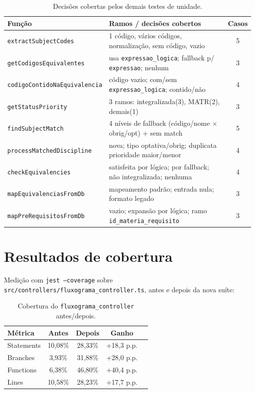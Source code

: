 \documentclass[11pt,a4paper]{article}
\begin{document}
\begin{table}[h]
\centering
\small
\renewcommand{\arraystretch}{1.15}
\begin{tabular}{@{}lp{8.6cm}c@{}}
\toprule
\textbf{Função} & \textbf{Ramos / decisões cobertos} & \textbf{Casos} \\
\midrule
\texttt{extractSubjectCodes}        & 1 código, vários códigos, normalização, sem código, vazio & 5 \\
\texttt{getCodigosEquivalentes}     & usa \texttt{expressao\_logica}; fallback p/ \texttt{expressao}; nenhum & 3 \\
\texttt{codigoContidoNaEquivalencia}& código vazio; com/sem \texttt{expressao\_logica}; contido/não & 4 \\
\texttt{getStatusPriority}          & 3 ramos: integralizada(3), MATR(2), demais(1) & 3 \\
\texttt{findSubjectMatch}           & 4 níveis de fallback (código/nome $\times$ obrig/opt) + sem match & 5 \\
\texttt{processMatchedDiscipline}   & nova; tipo optativa/obrig; duplicata prioridade maior/menor & 4 \\
\texttt{checkEquivalencies}         & satisfeita por lógica; por fallback; não integralizada; nenhuma & 4 \\
\texttt{mapEquivalenciasFromDb}     & mapeamento padrão; entrada nula; formato legado & 3 \\
\texttt{mapPreRequisitosFromDb}     & vazio; expansão por lógica; ramo \texttt{id\_materia\_requisito} & 3 \\
\bottomrule
\end{tabular}
\caption{Decisões cobertas pelos demais testes de unidade.}
\end{table}

\section{Resultados de cobertura}
\label{sec:resultados}

Medição com \texttt{jest --coverage} sobre
\texttt{src/controllers/fluxograma\_controller.ts}, antes e depois da nova suíte:

\begin{table}[h]
\centering
\small
\begin{tabular}{@{}lcccc@{}}
\toprule
\textbf{Métrica} & \textbf{Antes} & \textbf{Depois} & \textbf{Ganho} \\
\midrule
Statements & 10,08\% & 28,33\% & +18,3 p.p. \\
Branches   & 3,93\%  & 31,88\% & +28,0 p.p. \\
Functions  & 6,38\%  & 46,80\% & +40,4 p.p. \\
Lines      & 10,58\% & 28,23\% & +17,7 p.p. \\
\bottomrule
\end{tabular}
\caption{Cobertura do \texttt{fluxograma\_controller} antes/depois.}
\end{table}
\end{document}
